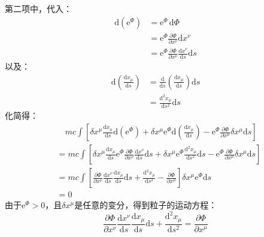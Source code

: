 \documentclass[a4paper,fontset=windows]{ctexart}
\begin{document}
\begin{itemize}
        第二项中，代入：
        \begin{align*}
        \mathrm{d}(\mathrm{e}^\varPhi)
        &= \mathrm{e}^\varPhi\,\mathrm{d}\varPhi \\
        &= \mathrm{e}^\varPhi\frac{\partial\varPhi}{\partial x^\nu}\mathrm{d}x^\nu \\
        &= \mathrm{e}^\varPhi\frac{\partial\varPhi}{\partial x^\nu}\frac{\mathrm{d}x^\nu}{\mathrm{d}s}\mathrm{d}s
        \end{align*}
        以及：
        \begin{align*}
        \mathrm{d}\left(\frac{\mathrm{d}x_\mu}{\mathrm{d}s}\right)
        &= \frac{\mathrm{d}}{\mathrm{d}s}\left(\frac{\mathrm{d}x_\mu}{\mathrm{d}s}\right)\mathrm{d}s \\
        &= \frac{\mathrm{d}^2 x_\mu}{\mathrm{d}s^2}\mathrm{d}s
        \end{align*}
        化简得：
        \begin{align*}
        &\quad mc\int\left[\delta x^\mu\frac{\mathrm{d}x_\mu}{\mathrm{d}s}\mathrm{d}(\mathrm{e}^\varPhi) + \delta x^\mu\mathrm{e}^\varPhi\mathrm{d}\left(\frac{\mathrm{d}x_\mu}{\mathrm{d}s}\right) - \mathrm{e}^\varPhi\frac{\partial\varPhi}{\partial x^\mu}\delta x^\mu\mathrm{d}s\right] \\
        &= mc\int\left[\delta x^\mu\frac{\mathrm{d}x_\mu}{\mathrm{d}s}\mathrm{e}^\varPhi\frac{\partial\varPhi}{\partial x^\nu}\frac{\mathrm{d}x^\nu}{\mathrm{d}s}\mathrm{d}s + \delta x^\mu\mathrm{e}^\varPhi\frac{\mathrm{d}^2 x_\mu}{\mathrm{d}s^2}\mathrm{d}s - \mathrm{e}^\varPhi\frac{\partial\varPhi}{\partial x^\mu}\delta x^\mu\mathrm{d}s\right] \\
        &= mc\int\left[\frac{\partial\varPhi}{\partial x^\nu}\frac{\mathrm{d}x^\nu}{\mathrm{d}s}\frac{\mathrm{d}x_\mu}{\mathrm{d}s}\mathrm{d}s + \frac{\mathrm{d}^2 x_\mu}{\mathrm{d}s^2} - \frac{\partial\varPhi}{\partial x^\mu}\right]\delta x^\mu\mathrm{e}^\varPhi\mathrm{d}s \\
        &= 0
        \end{align*}
        由于$\mathrm{e}^\varPhi > 0$，且$\delta x^\mu$是任意的变分，得到粒子的运动方程：
        \[
        \frac{\partial\varPhi}{\partial x^\nu}\frac{\mathrm{d}x^\nu}{\mathrm{d}s}\frac{\mathrm{d}x_\mu}{\mathrm{d}s}\mathrm{d}s + \frac{\mathrm{d}^2 x_\mu}{\mathrm{d}s^2} = \frac{\partial\varPhi}{\partial x^\mu}
        \]
        \medskip


\end{itemize}
\end{document}

